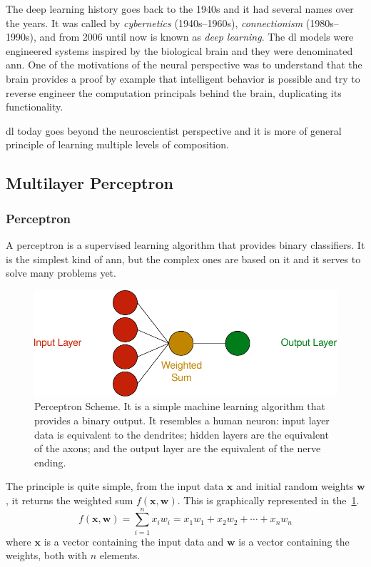 The deep learning history goes back to the 1940s and it had several names over the years. It was called by \emph{cybernetics} (1940s--1960s), \emph{connectionism} (1980s--1990s), and from 2006 until now is known as \emph{deep learning}.
The \gls*{dl} models were engineered systems inspired by the biological brain and they were denominated \gls*{ann}.
One of the motivations of the neural perspective was to understand that the brain provides a proof by example that intelligent behavior is possible and try to reverse engineer the computation principals behind the brain, duplicating its functionality.

\gls*{dl} today goes beyond the neuroscientist perspective and it is more of general principle of learning multiple levels of composition.

\subsection{Multilayer Perceptron}

\subsubsection*{Perceptron}

A perceptron is a supervised learning algorithm that provides binary classifiers. It is the simplest kind of \gls*{ann}, but the complex ones are based on it and it serves to solve many problems yet.

\begin{figure}[!htb]
    \centering
    \includegraphics{figures/2review/nn/perceptron.pdf}
    \caption[Perceptron Scheme]{Perceptron Scheme. It is a simple machine learning algorithm that provides a binary output. It resembles a human neuron: input layer data is equivalent to the dendrites; hidden layers are the equivalent of the axons; and the output layer are the equivalent of the nerve ending.}
    \label{fig:perceptron}
\end{figure}

The principle is quite simple, from the input data \(\mathbf{x}\) and initial random weights \(\mathbf{w}\), it returns the weighted sum \(f(\mathbf{x},\mathbf{w})\). This is graphically represented in the~\cref{fig:perceptron}.
%
\begin{equation}\label{eq:perceptron_weighted_sum}
    f(\mathbf{x},\mathbf{w}) = \sum_{i=1}^n x_iw_i =  x_1w_1 + x_2w_2 + \cdots + x_nw_n
\end{equation}
%
where \(\mathbf{x}\) is a vector containing the input data and \(\mathbf{w}\) is a vector containing the weights, both with \(n\) elements.

